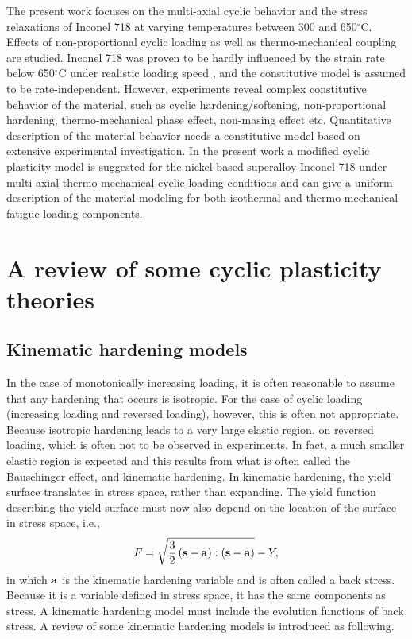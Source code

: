 The present work focuses on the multi-axial cyclic behavior and the stress relaxations of Inconel 718 at varying temperatures between 300 and 650$^{\circ}$C. Effects of non-proportional cyclic loading as well as thermo-mechanical coupling are studied. Inconel 718 was proven to be hardly influenced by the strain rate below 650$^{\circ}$C under realistic loading speed \cite{kim1988elevated, Schlesinger2017}, and the constitutive model is assumed to be rate-independent. However,  experiments reveal complex constitutive behavior of the material, such as cyclic hardening/softening, non-proportional hardening, thermo-mechanical phase effect, non-masing effect etc. Quantitative description of the material behavior needs a constitutive model based on extensive experimental investigation. In the present work a modified cyclic plasticity model is suggested for the nickel-based superalloy Inconel 718 under multi-axial thermo-mechanical cyclic loading conditions and can give a uniform description of the material modeling for both isothermal and thermo-mechanical fatigue loading components.

\section{A review of some cyclic plasticity theories}
\subsection{Kinematic hardening models}
In the case of monotonically increasing loading, it is often reasonable to assume that any hardening that occurs is isotropic.
For the case of cyclic loading (increasing loading and reversed loading), however, this is often not appropriate.
Because isotropic hardening leads to a very large elastic region, on reversed loading, which is often not to be observed in experiments.
In fact, a much smaller elastic region is expected and this results from what is often called the Bauschinger effect, and
kinematic hardening.
In kinematic hardening, the yield surface translates in stress space, rather than expanding.
The yield function describing the yield surface must now also depend on the location of the surface in stress space, i.e.,
\begin{equation}
F = \sqrt {\frac{3}{2}\left( {{\bf{s}} - {\bf{a}}} \right):\left( {{\bf{s}} - {\bf{a}}} \right)}  - Y,
\end{equation}
in which $\bf{a}$ is the kinematic hardening variable and is often called a back stress.
Because it is a variable defined in stress space, it has the same components as stress.
A kinematic hardening model must include the evolution functions of back stress.
A review of some kinematic hardening models is introduced as following.

